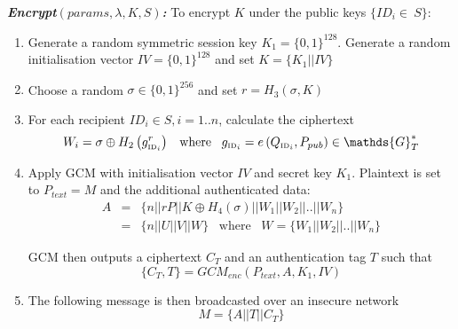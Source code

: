 \documentclass[11pt]{article}
\begin{document}
\textbf{\textit{Encrypt$\left( params, \lambda, K, S \right)$:}} To encrypt $K$ under the public keys $\{ ID_i \in \ S \}$:
\begin{enumerate}
 \item Generate a random symmetric session key $K_1 = \{ 0,1 \}^{128}$. Generate a random initialisation vector $IV = \{ 0,1 \}^{128}$ and set $K = \{ K_1 || IV \}$
 \item Choose a random $\sigma \in \{ 0,1 \}^{256}$ and set $r = H_3 \left( \sigma, K \right)$
 \item For each recipient $ID_i \in S, i = 1..n$, calculate the ciphertext
 \begin{equation*}
  W_i = \sigma \oplus H_2 \left( g_{{\textrm{\tiny{ID}}_i}}^r \right) \; \; \; \textrm{where} \; \; \; g_{\textrm{\tiny{ID}}_i} = e \left( Q_{\textrm{\tiny{ID}}_i}, P_{pub} \right) \in \mathds{G}_T^{*}
 \end{equation*}
 
 \item Apply GCM with initialisation vector $IV$ and secret key $K_1$. Plaintext is set to $P_{text} = M$ and the additional authenticated data:
 \begin{equation*}
 \begin{array}{lcl}
  A & = & \{ n || rP || K \oplus H_4 \left( \sigma \right) || W_1 || W_2 || .. || W_n \} \\
    & = & \{ n || U || V || W \} \; \; \; \textrm{where} \; \; \; W = \{ W_1 || W_2 || .. || W_n \}
 \end{array} 
 \end{equation*}
 
 GCM then outputs a ciphertext $C_T$ and an authentication tag $T$ such that
 \begin{equation*}
  \{ C_T, T \} = GCM_{enc} \left( P_{text}, A, K_1, IV \right)
 \end{equation*}
 
 \item The following message is then broadcasted over an insecure network
 \begin{equation*}
  M = \{ A || T || C_T \}
 \end{equation*}
\end{enumerate}
\end{document}
